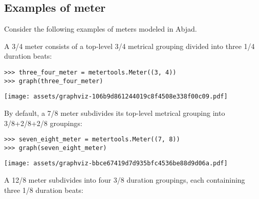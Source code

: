 \subsection{Examples of meter} %

Consider the following examples of meters modeled in Abjad.

A 3/4 meter consists of a top-level 3/4 metrical grouping divided into three
1/4 duration beats:

\begin{comment}
<abjad>
three_four_meter = metertools.Meter((3, 4))
graph(three_four_meter)
</abjad>
\end{comment}

\begin{singlespacing}
\vspace{-0.5\baselineskip}
\begin{lstlisting}
>>> three_four_meter = metertools.Meter((3, 4))
>>> graph(three_four_meter)
\end{lstlisting}
\texttt{[image: assets/graphviz-106b9d861244019c8f4508e338f00c09.pdf]}
\end{singlespacing}

\noindent By default, a 7/8 meter subdivides its top-level metrical grouping
into 3/8+2/8+2/8 groupings:

\begin{comment}
<abjad>
seven_eight_meter = metertools.Meter((7, 8))
graph(seven_eight_meter)
</abjad>
\end{comment}

\begin{singlespacing}
\vspace{-0.5\baselineskip}
\begin{lstlisting}
>>> seven_eight_meter = metertools.Meter((7, 8))
>>> graph(seven_eight_meter)
\end{lstlisting}
\texttt{[image: assets/graphviz-bbce67419d7d935bfc4536be88d9d06a.pdf]}
\end{singlespacing}

\noindent A 12/8 meter subdivides into four 3/8 duration groupings, each
containining three 1/8 duration beats:

\begin{comment}
<abjad>
twelve_eight_meter = metertools.Meter((12, 8))
graph(twelve_eight_meter)
</abjad>
\end{comment}

